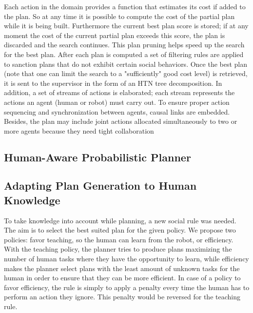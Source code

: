 

Each action in the domain provides a function that estimates its cost if added to the plan. So at any time it is possible to compute the cost of the partial plan while it is being built. Furthermore the current best plan score is stored;  if at any moment the cost of the current partial plan exceeds this score, the plan is discarded and the search continues. This plan pruning helps speed up the search for the best plan. After each plan is computed a set of filtering rules are applied to sanction plans that do not exhibit certain social behaviors. Once the best plan (note that one can limit the search to a "sufficiently" good  cost level)   is retrieved, it is sent to the supervisor in the form of an HTN tree decomposition. In addition, a set of streams of actions is elaborated; each stream represents the actions an agent (human or robot) must carry out. To ensure proper action sequencing and synchronization between agents, causal links are embedded. Besides, the plan may include joint actions allocated simultaneously to two or more agents because they need tight collaboration


\subsection{Human-Aware Probabilistic Planner}


\subsection{Adapting Plan Generation to Human Knowledge}
To take knowledge into account while planning, a new social rule was needed. The aim is to select the best suited plan for the given policy. We propose two policies: favor teaching, so the human can learn from the robot, or efficiency. With the teaching policy, the planner tries to produce plans maximizing the number of human tasks where they have the opportunity to learn, while efficiency makes the planner select plans with the least amount of unknown tasks for the human in order to ensure that they can be more efficient.
In case of a policy to favor efficiency, the rule is simply to apply a penalty every time the human has to perform an action they ignore. This penalty would be reversed for the teaching rule.

